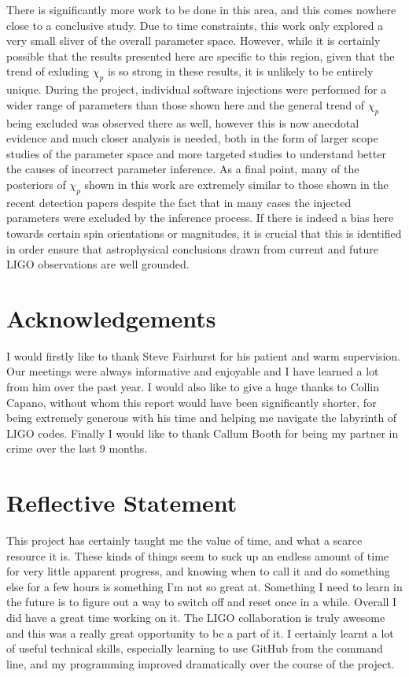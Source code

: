 \documentclass[11pt]{article}
\begin{document}
There is significantly more work to be done in this area, and this comes nowhere close to a conclusive study. Due to time constraints, this work only explored a very small sliver of the overall parameter space. However, while it is certainly possible that the results presented here are specific to this region, given that the trend of exluding $\chi_p$ is so strong in these results, it is unlikely to be entirely unique. During the project, individual software injections were performed for a wider range of parameters than those shown here and the general trend of $\chi_p$ being excluded was observed there as well, however this is now anecdotal evidence and much closer analysis is needed, both in the form of larger scope studies of the parameter space and more targeted studies to understand better the causes of incorrect parameter inference. As a final point, many of the posteriors of $\chi_p$ shown in this work are extremely similar to those shown in the recent detection papers\cite{obs}\cite{obs2} despite the fact that in many cases the injected parameters were excluded by the inference process. If there is indeed a bias here towards certain spin orientations or magnitudes, it is crucial that this is identified in order ensure that astrophysical conclusions drawn from current and future LIGO observations are well grounded.
\section{Acknowledgements}
I would firstly like to thank Steve Fairhurst for his patient and warm supervision. Our meetings were always informative and enjoyable and I have learned a lot from him over the past year. I would also like to give a huge thanks to Collin Capano, without whom this report would have been significantly shorter, for being extremely generous with his time and helping me navigate the labyrinth of LIGO codes. Finally I would like to thank Callum Booth for being my partner in crime over the last 9 months.
\section{Reflective Statement}
This project has certainly taught me the value of time, and what a scarce resource it is. These kinds of things seem to suck up an endless amount of time for very little apparent progress, and knowing when to call it and do something else for a few hours is something I'm not so great at. Something I need to learn in the future is to figure out a way to switch off and reset once in a while. Overall I did have a great time working on it. The LIGO collaboration is truly awesome and this was a really great opportunity to be a part of it. I certainly learnt a lot of useful technical skills, especially learning to use GitHub from the command line, and my programming improved dramatically over the course of the project. 


\end{document}
